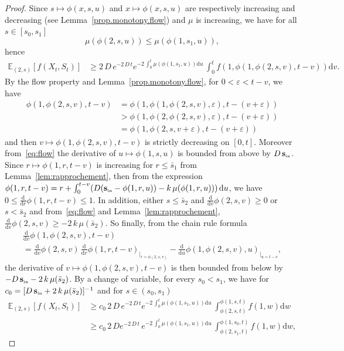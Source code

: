 \documentclass[10pt]{amsart}
\theoremstyle{definition}\newtheorem{defi}[theo]{Definition}\newtheorem{rema}[theo]{Remark}\newtheorem{exam}[theo]{Example}\newtheorem{exem}[theo]{Example}\newtheorem{nota}[theo]{Notation}
\newcommand{\EE}{\mathbb{E}}
\newcommand{\Sin}{{\mathbf s}_{\textrm{\tiny\rm in}}}
\newcommand{\dif}{\mathrm{d}}
\newcommand{\1}{\mathbf{1}}
\begin{document}
\begin{proof}
Since $s\mapsto \phi(x,s,u)$ and $x\mapsto \phi(x,s,u)$ are respectively increasing and decreasing (see Lemma~\ref{prop.monotony.flow}) and $\mu$ is increasing, we have for all $s\in [s_0,s_1]$
\[
\mu (\phi(2,s,u)) \leq \mu (\phi(1,s_1,u)),
\]
hence
\begin{align*}
\EE_{(2,s)}\left[f(X_t,S_t)\right] &\geq 2\,D\, e^{-2\,D \,t} e^{ - 2\,\int_0^t \mu (\phi(1,s_1,u)) \dif u}\, \int_0^t f\left(1, \phi(1,\phi(2,s,v),t-v)\right) \dif v.
\end{align*}
By the flow property and Lemma~\ref{prop.monotony.flow}, for $0<\varepsilon < t-v$, we have
\begin{align*}
\phi(1,\phi(2,s,v),t-v) & =
\phi(1,\phi(1,\phi(2,s,v),\varepsilon),t-(v+\varepsilon))
\\
&>
\phi(1,\phi(2,\phi(2,s,v),\varepsilon),t-(v+\varepsilon))
\\
&= \phi(1,\phi(2,s,v+\varepsilon),t-(v+\varepsilon))
\end{align*}
and then $v\mapsto \phi(1,\phi(2,s,v),t-v)$ is strictly decreasing on $[0,t]$. Moreover from~\eqref{eq:flow} the derivative of $u\mapsto \phi(1,s,u)$ is bounded from above by $D\,\Sin$. Since $r\mapsto \phi(1,r,t-v)$ is increasing for $r\leq \bar s_1$ from Lemma~\ref{lem:rapprochement}, then from the expression $\phi(1,r,t-v) = r + \int_0^{t-v} (D(\Sin-\phi(1,r,u))-k\,\mu(\phi(1,r,u)))\,\dif u$, we have $0\leq\frac{\dif}{\dif r}\phi(1,r,t-v)\leq 1$. In addition, either $s\leq \bar s_2$ and $\frac{\dif}{\dif v}\phi(2,s,v)\geq 0$ or $s< \bar s_2$ and from~\eqref{eq:flow} and Lemma~\ref{lem:rapprochement}, $\frac{\dif}{\dif v}\phi(2,s,v)\geq -2\,k\,\mu(\bar s_2)$. So finally, from the chain rule formula
\begin{multline*}
\frac{\dif}{\dif v} \phi(1,\phi(2,s,v),t-v) \\= \frac{\dif}{\dif v}\phi(2,s,v)\,\frac{\dif}{\dif r} \phi(1,r,t-v)_{\vert_{r=\phi(2,s,v)}} - \frac{\dif}{\dif u} \phi(1,\phi(2,s,v),u)_{\vert_{u=t-v}},
\end{multline*}
the derivative of $v\mapsto \phi(1,\phi(2,s,v),t-v)$ is then bounded from below by $-D\,\Sin-2\,k\,\mu(\bar s_2)$. By a change of variable, for every $s_0<s_1$, we have for $c_0=[D\,\Sin+2\,k\,\mu(\bar s_2)]^{-1}$ and for $s\in (s_0,s_1)$
\begin{align*}
\EE_{(2,s)}\left[f(X_t,S_t)\right] &\geq c_{0} \,2\,D \, e^{-2\, D\, t} e^{ - 2\,\int_0^t \mu (\phi(1,s_1,u)) \dif u}\, \int_{\phi(2,s,t)}^{\phi(1,s,t)} f(1,w) \dif w \\
&\geq c_{0} \,2\, D e^{-2\, D\, t}\, e^{ - 2\,\int_0^t \mu (\phi(1,s_1,u)) \dif u} \,\int_{\phi(2,s_1,t)}^{\phi(1,s_0,t)} f(1,w) \dif w,

\end{align*}
\end{proof}
\end{document}
